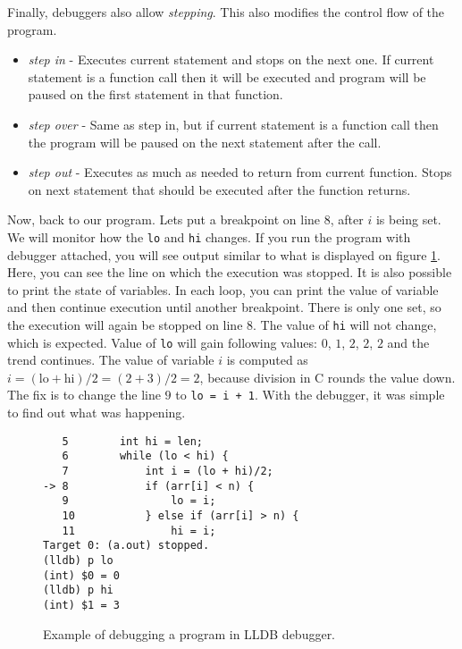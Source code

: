 Finally, debuggers also allow \textit{stepping}. This also modifies the control
flow of the program.
\begin{itemize}
    \item \textit{step in} - Executes current statement and stops on the next
        one. If current statement is a function call then it will be executed
        and program will be paused on the first statement in that function.
    \item \textit{step over} - Same as step in, but if current statement is a
        function call then the program will be paused on the next statement
        after the call.
    \item \textit{step out} -  Executes as much as needed to return from
        current function. Stops on next statement that should be executed after
        the function returns.
\end{itemize}

Now, back to our program. Lets put a breakpoint on line $8$, after $i$ is being
set. We will monitor how the \texttt{lo} and \texttt{hi} changes. If you run
the program with debugger attached, you will see output similar to what is
displayed on figure \ref{fig:lldb-debug1}. Here, you can see the line on which
the execution was stopped. It is also possible to print the state of variables.
In each loop, you can print the value of variable and then continue execution
until another breakpoint. There is only one set, so the execution will again be
stopped on line $8$. The value of \texttt{hi} will not change, which is
expected. Value of \texttt{lo} will gain following values: $0$, $1$, $2$, $2$,
$2$ and the trend continues. The value of variable $i$ is computed as $i =
(\text{lo} + \text{hi})/2 = (2 + 3)/2 = 2$, because division in C rounds the
value down. The fix is to change the line $9$ to \texttt{lo = i + 1}. With the
debugger, it was simple to find out what was happening.

\begin{figure}\label{fig:lldb-debug1}
\begin{verbatim}
   5   	    int hi = len;
   6   	    while (lo < hi) {
   7   	        int i = (lo + hi)/2;
-> 8   	        if (arr[i] < n) {
   9   	            lo = i;
   10  	        } else if (arr[i] > n) {
   11  	            hi = i;
Target 0: (a.out) stopped.
(lldb) p lo
(int) $0 = 0
(lldb) p hi
(int) $1 = 3
\end{verbatim}
\caption{Example of debugging a program in LLDB debugger.}
\end{figure}

